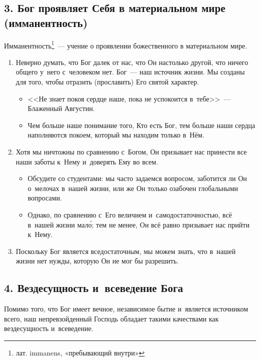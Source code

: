 \documentclass[a4paper,12pt]{article}
\begin{document}
\subsection{3. Бог проявляет Себя в материальном мире (имманентность)}

Имманентность\footnote{лат. immanens, «пребывающий внутри»}~--- учение о проявлении божественного в материальном мире.

\begin{enumerate}
    \item Неверно думать, что Бог далек от нас, что Он настолько другой, что ничего общего у~него с~человеком нет. Бог~--- наш источник жизни. Мы созданы для того, чтобы отразить (прославить) Его святой характер.
    \begin{itemize}
        \item <<Не знает покоя сердце наше, пока не успокоится в~тебе>>~--- Блаженный Августин. 
        \item Чем больше наше понимание того, Кто есть Бог, тем больше наши сердца наполняются покоем, который мы находим только в~Нём.
    \end{itemize}
    \item Хотя мы ничтожны по сравнению с~Богом, Он призывает нас принести все наши заботы к~Нему и~доверять Ему во всем.
    \begin{itemize}
        \item Обсудите со студентами: мы часто задаемся вопросом, заботится ли Он о~мелочах в~нашей жизни, или же Он только озабочен глобальными вопросами.
        \item Однако, по сравнению с~Его величием и~самодостаточностью, всё в~нашей жизни мал\'{о}; тем не менее, Он всё равно призывает нас прийти к~Нему.
    \end{itemize}

    \item Поскольку Бог является вседостаточным, мы можем знать, что в~нашей жизни нет нужды, которую Он не мог бы разрешить.
\end{enumerate}

\subsection{4. Вездесущность и~всеведение Бога}

Помимо того, что Бог имеет вечное, независимое бытие и~является источником всего, наш непревзойденный Господь обладает такими качествами как вездесущность и~всеведение. 
\end{document}
